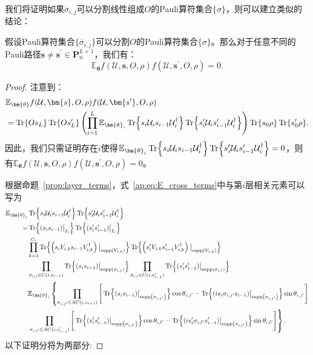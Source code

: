 我们将证明如果${\overline{\sigma}_{i,j}}$可以分割线性组成$O$的Pauli算符集合$\{\sigma\}$，则可以建立类似的结论： 
\begin{lemma}\label{ap:lemma:split} 
    假设Pauli算符集合$\{\overline{\sigma}_{i,j}\}$可以分割$O$的Pauli算符集合$\{\sigma\}$。那么对于任意不同的Pauli路径$\bm{s}\neq \bm{s^{\prime}}\in \bm{P}^{L+1}_n$，我们有：
    \begin{equation} 
        \mathbb{E}_{\bm{\theta}}f(\mathcal{U},\bm{s},O,\rho)f(\mathcal{U},\bm{s^{\prime}},O,\rho)=0. 
    \end{equation}
    \begin{proof}
    注意到：
    \begin{equation}\label{ap:eq:E_cross_terms} 
        \begin{aligned} 
            &\mathbb{E}_{\bm{\theta}}f(\mathcal{U},\bm{s},O,\rho)f(\mathcal{U},\bm{s^{\prime}},O,\rho)\\
            &=\Tr{Os_L}\Tr{Os'_L}\left(\prod_{i=1}^{L}\mathbb{E}_{\bm{\theta}_i}\Tr{s_i\mathcal{U}_i s_{i-1}\mathcal{U}_i^\dagger}\Tr{s'_i\mathcal{U}_i s'_{i-1}\mathcal{U}_i^\dagger}\right)\Tr{s_0\rho}\Tr{s'_0\rho}.
        \end{aligned} 
    \end{equation} 
    因此，我们只需证明存在$i$使得$\mathbb{E}_{\bm{\theta}_i}\Tr{s_i\mathcal{U}_i s_{i-1}\mathcal{U}_i^\dagger}\Tr{s'_i\mathcal{U}_i s'_{i-1}\mathcal{U}_i^\dagger}=0$，则有$\mathbb{E}_{\bm{\theta}}f(\mathcal{U},\bm{s},O,\rho)f(\mathcal{U},\bm{s^{\prime}},O,\rho)=0$。
    
    根据命题~\ref{prop:layer_terms}，式~\eqref{ap:eq:E_cross_terms}中与第$i$层相关元素可以写为 
    \begin{equation}\label{ap:eq:E_cross_i-layer} 
        \begin{aligned} 
            \mathbb{E}_{\bm{\theta}_i}&\Tr{s_i\mathcal{U}_i s_{i-1}\mathcal{U}_i^\dagger}\Tr{s'_i\mathcal{U}_i s'_{i-1}\mathcal{U}_i^\dagger}\\
            =&\Tr{(s_i s_{i-1})\big|_{I_i}}\Tr{(s'_i s'_{i-1})\big|_{I_i}}\\
            &\prod_{k=1}^{C_i}\Tr{\left(s_iV_{i,k} s_{i-1}V_{i,k}^{\dagger}\right)\big|_\g{V_{i,k}}}\Tr{\left(s'_iV_{i,k} s'_{i-1}V_{i,k}^{\dagger}\right)\big|_\g{V_{i,k}}}\\
            &\prod_{\sigma_{i,j}\in C(i,s_{i-1})}\Tr{(s_i s_{i-1})\big|_{\g{\sigma_{i,j}}}}\prod_{\sigma_{i,l}\in C(i,s_{i-1}')}\Tr{(s'_i s'_{i-1})\big|_{\g{\sigma_{i,l}}}}\\
            &\mathbb{E}_{\bm{\theta}_i}\left\{\prod_{\sigma_{i,j'}\in AC(i,s_{i-1})}\Bigg[ \Tr{(s_i s_{i-1})\big|_{\g{\sigma_{i,j'}}}}\cos{\theta_{i,j'}}
            - \Tr{(is_i \sigma_{i,j'}s_{i-1})\big|_{\g{\sigma_{i,j'}}}}\sin{\theta_{i,j'}}\Bigg]\right.\\
            &\left.\prod_{\sigma_{i,l'}\in AC(i,s_{i-1}')}\Bigg[ \Tr{(s'_i s'_{i-1})\big|_{\g{\sigma_{i,l'}}}}\cos{\theta_{i,l'}}
            - \Tr{(is'_i \sigma_{i,l'}s'_{i-1})\big|_{\g{\sigma_{i,l'}}}}\sin{\theta_{i,l'}}\Bigg]\right\}.
        \end{aligned} 
    \end{equation}
    以下证明分将为两部分:


\end{proof}
\end{lemma}
